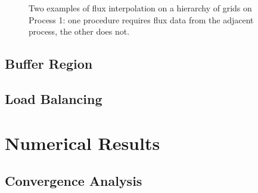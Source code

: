\documentclass[12pt,letterpaper]{article}
\begin{document}

    \begin{figure}[H]
        \center
        
        \caption{}
    \end{figure}


    \begin{figure}[H]
        \center
        
       \caption{Two examples of flux interpolation on a hierarchy of grids
        on Process 1: one procedure requires flux data from the adjacent
        process, the other does not.}
    \end{figure}

    \subsection*{Buffer Region}

    \subsection*{Load Balancing}

\section{Numerical Results}

    \subsection*{Convergence Analysis}
\end{document}
